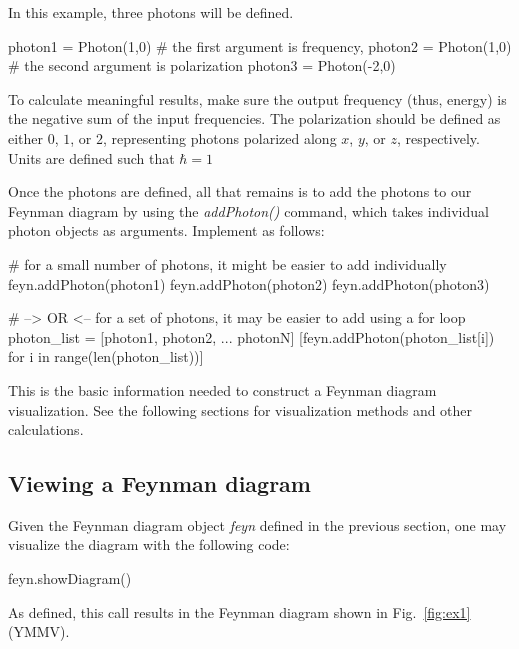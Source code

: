 \documentclass[11pt,a4paper,notitlepage]{article}
\begin{document}
In this example, three photons will be defined.

\begin{code}
photon1 = Photon(1,0)	# the first argument is frequency,
photon2 = Photon(1,0)	# the second argument is polarization
photon3 = Photon(-2,0)
\end{code}

To calculate meaningful results, make sure the output frequency (thus, energy) is the negative sum of the input frequencies. The polarization should be defined as either $0$, $1$, or $2$, representing photons polarized along $x$, $y$, or $z$, respectively. Units are defined such that $\hbar=1$

Once the photons are defined, all that remains is to add the photons to our Feynman diagram by using the \textit{addPhoton()} command, which takes individual photon objects as arguments. Implement as follows:

\begin{code}
# for a small number of photons, it might be easier to add individually
feyn.addPhoton(photon1)
feyn.addPhoton(photon2)
feyn.addPhoton(photon3)

# --> OR <-- for a set of photons, it may be easier to add using a for loop
photon_list = [photon1, photon2, ... photonN]
[feyn.addPhoton(photon_list[i]) for i in range(len(photon_list))]
\end{code}

This is the basic information needed to construct a Feynman diagram visualization. See the following sections for visualization methods and other calculations.

\subsection{Viewing a Feynman diagram}

Given the Feynman diagram object \textit{feyn} defined in the previous section, one may visualize the diagram with the following code:

\begin{code}
feyn.showDiagram()
\end{code}

As defined, this call results in the Feynman diagram shown in Fig.~\ref{fig:ex1} (YMMV).
\end{document}
